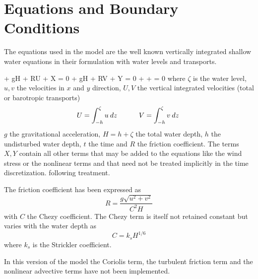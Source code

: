\newcommand{\uv} {{\bf U}}
\newcommand{\uvold} {{\bf U^{(0)}}}
\newcommand{\uvnew} {{\bf U^{(1)}}}
\newcommand{\af} {\alpha_{f}}
\newcommand{\ac} {\alpha_{c}}
\newcommand{\am} {\alpha_{m}}
\newcommand{\duv} {\Delta {\bf U}}
\newcommand{\dzeta} {\Delta \zeta}
\newcommand{\iv} {{\bf I}}
\newcommand{\ivh} {\hat{\bf I}}
\newcommand{\fv} {{\bf F}}
\newcommand{\uvh} {\hat{\bf U}}




\section{Equations and Boundary Conditions}

The equations used in the model are the well known vertically integrated
shallow water equations in their formulation with water levels and
transports.

\beq \label{ubar}
 + gH \xdif{\zeta} + RU + X = 0
\eeq
\beq
{} + gH \ydif{\zeta} + RV + Y = 0
\eeq
\beq \label{zcon}
\tdif{\zeta} +  +  = 0
\eeq
where $\zeta$ is the water level, $u,v$ the velocities in $x$ and $y$
direction,
$U,V$ the vertical integrated velocities (total  or barotropic
transports)
\[
 U = \int_{-h}^{\zeta} u \: dz \; \hspace{1.cm}
 V = \int_{-h}^{\zeta} v \: dz \;
\]
$g$ the gravitational acceleration, $H=h+\zeta$ the total water
depth, $h$ the undisturbed water depth,
$t$ the time and $R$ the friction coefficient. The terms $X,Y$ contain
all other terms that may be added to the equations like the wind stress or
the nonlinear terms and that need not be treated implicitly in the
time discretization.
following treatment.

The friction coefficient has been expressed as
\begin{equation}
	R = \frac{g \sqrt{u^{2}+v^{2}}}{C^{2} H}
\end{equation}
with $C$ the Chezy coefficient. The Chezy term is itself not retained
constant but varies with the water depth as
\begin{equation}
	C = k_{s} H^{1/6}
\end{equation}
where $k_{s}$ is the Strickler coefficient.

In this version of the model the Coriolis term, the turbulent friction term
and the nonlinear advective terms have not been implemented.

